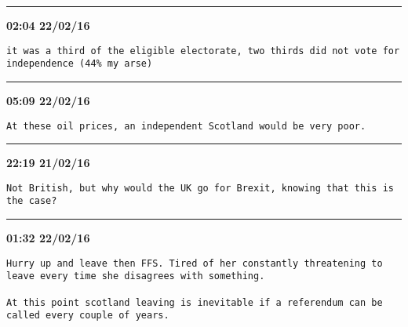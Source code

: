 \hrule%

\begin{adjustwidth}{4cm}{0cm}
\footnotesize \textbf{02:04 22/02/16}

\begin{lstlisting}[breaklines, breakatwhitespace, basicstyle=\small, frame=leftline]
it was a third of the eligible electorate, two thirds did not vote for independence (44% my arse)
\end{lstlisting}
\end{adjustwidth}

\hrule%

\begin{adjustwidth}{4cm}{0cm}
\footnotesize \textbf{05:09 22/02/16}

\begin{lstlisting}[breaklines, breakatwhitespace, basicstyle=\small, frame=leftline]
At these oil prices, an independent Scotland would be very poor.
\end{lstlisting}
\end{adjustwidth}

\hrule%

\begin{adjustwidth}{0cm}{0cm}
\footnotesize \textbf{22:19 21/02/16}

\begin{lstlisting}[breaklines, breakatwhitespace, basicstyle=\small, frame=leftline]
Not British, but why would the UK go for Brexit, knowing that this is the case?
\end{lstlisting}
\end{adjustwidth}

\hrule%

\begin{adjustwidth}{0cm}{0cm}
\footnotesize \textbf{01:32 22/02/16}

\begin{lstlisting}[breaklines, breakatwhitespace, basicstyle=\small, frame=leftline]
Hurry up and leave then FFS. Tired of her constantly threatening to leave every time she disagrees with something.

At this point scotland leaving is inevitable if a referendum can be called every couple of years. 
\end{lstlisting}
\end{adjustwidth}

